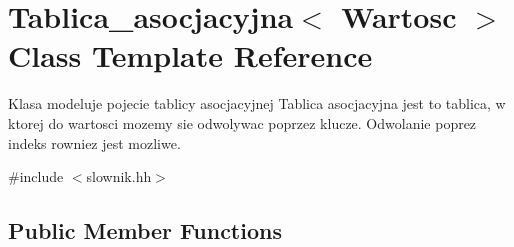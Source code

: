\hypertarget{class_tablica__asocjacyjna}{\section{Tablica\-\_\-asocjacyjna$<$ Wartosc $>$ Class Template Reference}
\label{class_tablica__asocjacyjna}
}


Klasa modeluje pojecie tablicy asocjacyjnej Tablica asocjacyjna jest to tablica, w ktorej do wartosci mozemy sie odwolywac poprzez klucze. Odwolanie poprez indeks rowniez jest mozliwe.  




{\ttfamily \#include $<$slownik.\-hh$>$}

\subsection*{Public Member Functions}
